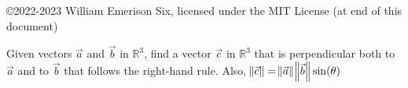 \documentclass[12pt]{article}
\newcommand{\R}{\mathbb{R}}
\newenvironment{problem}[2][Problem]{\begin{trivlist}
\item[\hskip \labelsep {\bfseries #1}\hskip \labelsep {\bfseries #2.}]}{\end{trivlist}}
\begin{document}

\rhead{\today}


\copyright 2022-2023 William Emerison Six, licensed under the MIT License (at end of this document)

\renewcommand{\arraystretch}{2.0}
\setlength{\arraycolsep}{0.5cm}

\begin{problem}{1} %

  Given vectors $\vec{a}$ and $\vec{b}$ in $\R^3$, find a vector $\vec{c}$ in $\R^3$ that is perpendicular both to $\vec{a}$ and to $\vec{b}$
  that follows the right-hand rule.  Also, $\norm{\vec{c}} = \norm{\vec{a}}\norm{\vec{b}}\sin(\theta) $
\end{problem}
\end{document}
